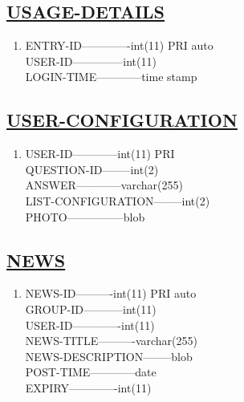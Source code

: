 \documentclass{article}
\begin{document}
\subsection*{\underline{USAGE-DETAILS}}
\begin{enumerate}
\item[{}{}]

ENTRY-ID-------------int(11)                PRI              auto \\
USER-ID--------------int(11) \\
LOGIN-TIME------------time stamp\\
\end{enumerate}
\subsection*{\underline{USER-CONFIGURATION}}
\begin{enumerate}
\item[{}{}]

USER-ID------------int(11)                    PRI \\             
QUESTION-ID--------int(2) \\
ANSWER------------varchar(255) \\
LIST-CONFIGURATION--------int(2) \\
PHOTO---------------blob\\
\end{enumerate}
\subsection*{\underline{NEWS}}
\begin{enumerate}
\item[{}{}]

NEWS-ID----------int(11)        PRI           auto \\
GROUP-ID-----------int(11) \\
USER-ID-------------int(11) \\
NEWS-TITLE----------varchar(255)\\ 
NEWS-DESCRIPTION--------blob \\
POST-TIME------------date \\
EXPIRY-------------int(11)\\
\end{enumerate}
\end{document}
